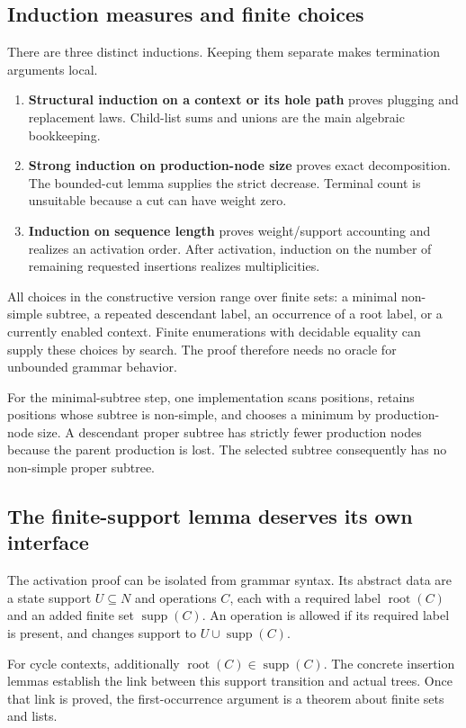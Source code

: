 \documentclass[11pt,a4paper]{article}
\numberwithin{equation}{section}
\theoremstyle{plain}
\theoremstyle{definition}
\theoremstyle{remark}
\newcommand{\supp}{\operatorname{supp}}
\newcommand{\rt}{\operatorname{root}}
\begin{document}
\subsection{Induction measures and finite choices}
There are three distinct inductions. Keeping them separate makes termination arguments local.
\begin{enumerate}
\item \textbf{Structural induction on a context or its hole path} proves plugging and replacement laws. Child-list sums and unions are the main algebraic bookkeeping.
\item \textbf{Strong induction on production-node size} proves exact decomposition. The bounded-cut lemma supplies the strict decrease. Terminal count is unsuitable because a cut can have weight zero.
\item \textbf{Induction on sequence length} proves weight/support accounting and realizes an activation order. After activation, induction on the number of remaining requested insertions realizes multiplicities.
\end{enumerate}

All choices in the constructive version range over finite sets: a minimal non-simple subtree, a repeated descendant label, an occurrence of a root label, or a currently enabled context. Finite enumerations with decidable equality can supply these choices by search. The proof therefore needs no oracle for unbounded grammar behavior.

For the minimal-subtree step, one implementation scans positions, retains positions whose subtree is non-simple, and chooses a minimum by production-node size. A descendant proper subtree has strictly fewer production nodes because the parent production is lost. The selected subtree consequently has no non-simple proper subtree.

\subsection{The finite-support lemma deserves its own interface}
The activation proof can be isolated from grammar syntax. Its abstract data are a state support $U\subseteq N$ and operations $C$, each with a required label $\rt(C)$ and an added finite set $\supp(C)$. An operation is allowed if its required label is present, and changes support to $U\cup\supp(C)$.

For cycle contexts, additionally $\rt(C)\in\supp(C)$. The concrete insertion lemmas establish the link between this support transition and actual trees. Once that link is proved, the first-occurrence argument is a theorem about finite sets and lists.
\end{document}
